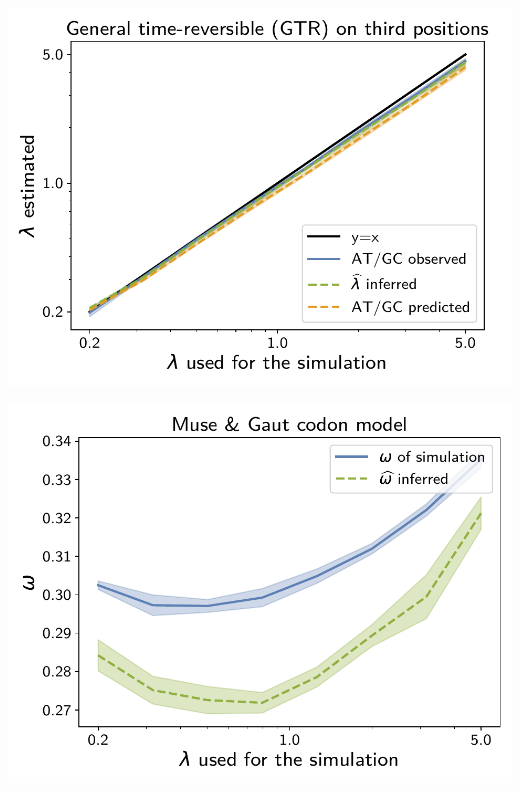 \documentclass{article}
\begin{document}
\begin{center}
    \begin{minipage}{0.325\linewidth}
        \includegraphics[width=\linewidth, page=1]{inference_supp_mat/PrimatesExons10Mu4.0_lambda_GTR.pdf}
    \end{minipage}
    \hfill
    \begin{minipage}{0.325\linewidth}
        \includegraphics[width=\linewidth, page=1]{inference_supp_mat/PrimatesExons10Mu4.0_omega_MG.pdf}
    \end{minipage}
    \begin{minipage}{0.325\linewidth}

\end{minipage}
\end{center}
\end{document}
